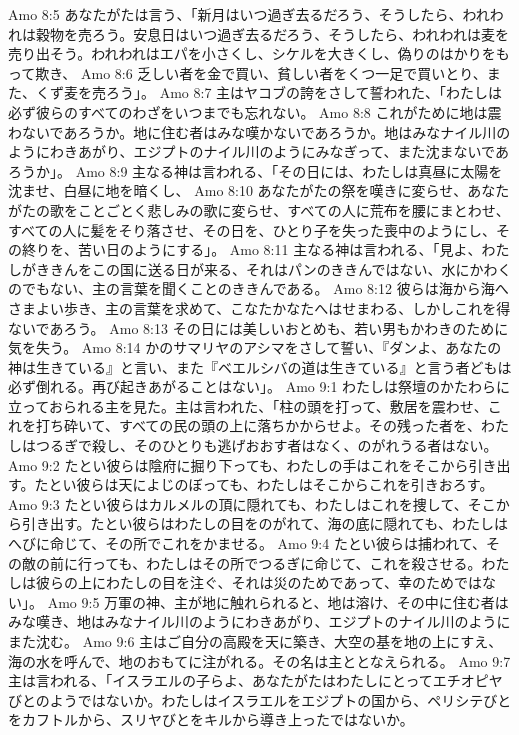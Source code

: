 Amo 8:5  あなたがたは言う、「新月はいつ過ぎ去るだろう、そうしたら、われわれは穀物を売ろう。安息日はいつ過ぎ去るだろう、そうしたら、われわれは麦を売り出そう。われわれはエパを小さくし、シケルを大きくし、偽りのはかりをもって欺き、
Amo 8:6  乏しい者を金で買い、貧しい者をくつ一足で買いとり、また、くず麦を売ろう」。
Amo 8:7  主はヤコブの誇をさして誓われた、「わたしは必ず彼らのすべてのわざをいつまでも忘れない。
Amo 8:8  これがために地は震わないであろうか。地に住む者はみな嘆かないであろうか。地はみなナイル川のようにわきあがり、エジプトのナイル川のようにみなぎって、また沈まないであろうか」。
Amo 8:9  主なる神は言われる、「その日には、わたしは真昼に太陽を沈ませ、白昼に地を暗くし、
Amo 8:10  あなたがたの祭を嘆きに変らせ、あなたがたの歌をことごとく悲しみの歌に変らせ、すべての人に荒布を腰にまとわせ、すべての人に髪をそり落させ、その日を、ひとり子を失った喪中のようにし、その終りを、苦い日のようにする」。
Amo 8:11  主なる神は言われる、「見よ、わたしがききんをこの国に送る日が来る、それはパンのききんではない、水にかわくのでもない、主の言葉を聞くことのききんである。
Amo 8:12  彼らは海から海へさまよい歩き、主の言葉を求めて、こなたかなたへはせまわる、しかしこれを得ないであろう。
Amo 8:13  その日には美しいおとめも、若い男もかわきのために気を失う。
Amo 8:14  かのサマリヤのアシマをさして誓い、『ダンよ、あなたの神は生きている』と言い、また『ベエルシバの道は生きている』と言う者どもは必ず倒れる。再び起きあがることはない」。
Amo 9:1  わたしは祭壇のかたわらに立っておられる主を見た。主は言われた、「柱の頭を打って、敷居を震わせ、これを打ち砕いて、すべての民の頭の上に落ちかからせよ。その残った者を、わたしはつるぎで殺し、そのひとりも逃げおおす者はなく、のがれうる者はない。
Amo 9:2  たとい彼らは陰府に掘り下っても、わたしの手はこれをそこから引き出す。たとい彼らは天によじのぼっても、わたしはそこからこれを引きおろす。
Amo 9:3  たとい彼らはカルメルの頂に隠れても、わたしはこれを捜して、そこから引き出す。たとい彼らはわたしの目をのがれて、海の底に隠れても、わたしはへびに命じて、その所でこれをかませる。
Amo 9:4  たとい彼らは捕われて、その敵の前に行っても、わたしはその所でつるぎに命じて、これを殺させる。わたしは彼らの上にわたしの目を注ぐ、それは災のためであって、幸のためではない」。
Amo 9:5  万軍の神、主が地に触れられると、地は溶け、その中に住む者はみな嘆き、地はみなナイル川のようにわきあがり、エジプトのナイル川のようにまた沈む。
Amo 9:6  主はご自分の高殿を天に築き、大空の基を地の上にすえ、海の水を呼んで、地のおもてに注がれる。その名は主ととなえられる。
Amo 9:7  主は言われる、「イスラエルの子らよ、あなたがたはわたしにとってエチオピヤびとのようではないか。わたしはイスラエルをエジプトの国から、ペリシテびとをカフトルから、スリヤびとをキルから導き上ったではないか。
